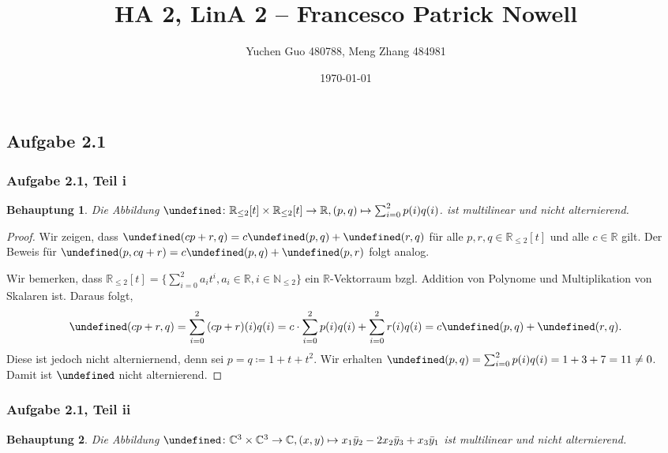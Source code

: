 \documentclass[draft,a5paper]{article}
\author{Yuchen Guo 480788, Meng Zhang 484981}
\date{\today}
\title{HA 2, LinA 2 -- Francesco Patrick Nowell}
\newtheorem*{beh}{Behauptung}
\let\phi\undefined
\newcommand{\phi}{\varphi}
\begin{document}
\maketitle

\newpage

\subsection*{Aufgabe 2.1}

\subsubsection*{Aufgabe 2.1, Teil i}

\begin{beh}
  Die Abbildung
  \(\phi \colon \mathbb{R}_{\le 2}[t] \times \mathbb{R}_{\le 2}[t] \to \mathbb{R}, (p, q) \mapsto \sum_{i =
    0}^{2}{p(i)q(i)}\).  ist multilinear und nicht alternierend.
\end{beh}

\begin{proof}
  Wir zeigen, dass \(\phi(cp+r,q)=c\phi(p,q) + \phi(r,q)\) für alle
  \(p, r, q \in \mathbb{R}_{\le 2}[t]\) und alle \(c \in \mathbb{R}\) gilt.  Der Beweis für
  \(\phi(p,cq+r) = c\phi(p,q)+\phi(p,r)\) folgt analog.

  Wir bemerken, dass \(\mathbb{R}_{\le 2}[t] = \{\sum_{i=0}^{2}{a_{i}t^{i}}, a_{i} \in
  \mathbb{R}, i \in \mathbb{N}_{\le 2}\}\) ein \(\mathbb{R}\)-Vektorraum bzgl. Addition von Polynome
  und Multiplikation von Skalaren ist.  Daraus folgt,
  \begin{align*}
    \phi(cp+r,q)
    = \sum_{i=0}^{2}{(cp+r)(i)q(i)}
    = c \cdot \sum_{i=0}^{2}{p(i)q(i)} + \sum_{i=0}^{2}{r(i)q(i)}
    = c \phi(p,q) + \phi(r,q).
  \end{align*}
  Diese ist jedoch nicht alterniernend, denn sei \(p = q \coloneq 1 + t +
  t^{2}\).  Wir erhalten
  \(\phi(p,q) = \sum_{i=0}^{2}{p(i)q(i)} = 1 + 3 + 7 = 11 \ne 0\).
  Damit ist \(\phi\) nicht alternierend.
\end{proof}

\subsubsection*{Aufgabe 2.1, Teil ii}

\begin{beh}
  Die Abbildung
  \(\phi \colon \mathbb{C}^{3} \times \mathbb{C}^{3} \to \mathbb{C}, (x, y) \mapsto x_{1} \bar{y}_{2} - 2x_{2}
  \bar{y}_{3} + x_{3} \bar{y}_{1}\) ist multilinear und nicht
  alternierend.
\end{beh}
\end{document}
